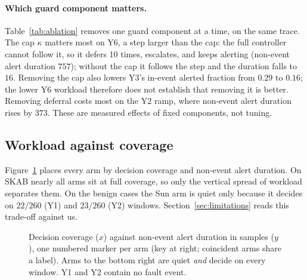 \paragraph{Which guard component matters.}
Table~\ref{tab:ablation} removes one guard component at a time, on the same trace. The
cap $\kappa$ matters most on Y6, a step larger than the cap: the full controller cannot
follow it, so it defers 10 times, escalates, and keeps alerting (non-event alert
duration $757$); without the cap it follows the step and the duration falls to $16$.
Removing the cap also lowers Y3's in-event alerted fraction from $0.29$ to $0.16$;
the lower Y6 workload therefore does not establish that removing it is better.
Removing deferral costs most on the Y2 ramp, where non-event alert duration rises by
$373$. These are measured effects of fixed components, not tuning.

\begin{table}[tbp]
  \centering
  \caption{Change in each synthetic outcome when one guard component (cap $\kappa$,
  stability $\rho$ or deferral $D$) is removed, relative to the full controller. Only
  non-zero changes are shown.}
  \label{tab:ablation}
  \small
  
\end{table}

\subsection{Workload against coverage}\label{sec:results-tradeoff}
\Smeasured{} Figure~\ref{fig:tradeoff} places every arm by decision coverage and
non-event alert duration. On SKAB nearly all arms sit at full coverage, so only the
vertical spread of workload separates them. On the benign cases the Sun arm is quiet
only because it decides on $22/260$ (Y1) and $23/260$ (Y2) windows. Section~\ref{sec:limitations}
reads this trade-off against us.

\begin{figure}[tbp]
  \centering
  \resizebox{0.78\linewidth}{!}{}
  \caption{Decision coverage ($x$) against non-event alert duration in samples ($y$),
  one numbered marker per arm (key at right; coincident arms share a label). Arms to the
  bottom right are quiet \emph{and} decide on every window. Y1 and Y2 contain no fault
  event.}
  \label{fig:tradeoff}
\end{figure}
